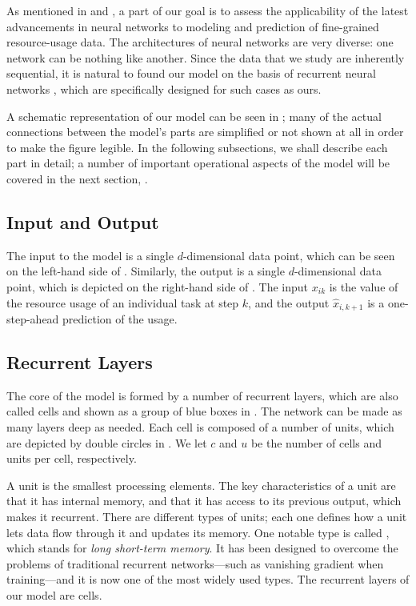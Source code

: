 
As mentioned in  and , a part of our goal is to
assess the applicability of the latest advancements in neural networks
\cite{goodfellow2016} to modeling and prediction of fine-grained resource-usage
data. The architectures of neural networks are very diverse: one network can be
nothing like another. Since the data that we study are inherently sequential, it
is natural to found our model on the basis of recurrent neural networks
\cite{goodfellow2016}, which are specifically designed for such cases as ours.

A schematic representation of our model can be seen in ; many of the
actual connections between the model's parts are simplified or not shown at all
in order to make the figure legible. In the following subsections, we shall
describe each part in detail; a number of important operational aspects of the
model will be covered in the next section, .

\subsection{Input and Output}
The input to the model is a single $d$-dimensional data point, which can be seen
on the left-hand side of . Similarly, the output is a single
$d$-dimensional data point, which is depicted on the right-hand side of
. The input $x_{ik}$ is the value of the resource usage of an
individual task at step $k$, and the output $\hat{x}_{i,k + 1}$ is a
one-step-ahead prediction of the usage.

\subsection{Recurrent Layers} 
The core of the model is formed by a number of recurrent layers, which are also
called cells and shown as a group of blue boxes in . The network can
be made as many layers deep as needed. Each cell is composed of a number of
units, which are depicted by double circles in . We let $c$ and $u$
be the number of cells and units per cell, respectively.

A unit is the smallest processing elements. The key characteristics of a unit
are that it has internal memory, and that it has access to its previous output,
which makes it recurrent. There are different types of units; each one defines
how a unit lets data flow through it and updates its memory. One notable type is
called  \cite{hochreiter1997}, which stands for \emph{long short-term
memory}. It has been designed to overcome the problems of traditional recurrent
networks---such as vanishing gradient when training---and it is now one of the
most widely used types. The recurrent layers of our model are  cells.

